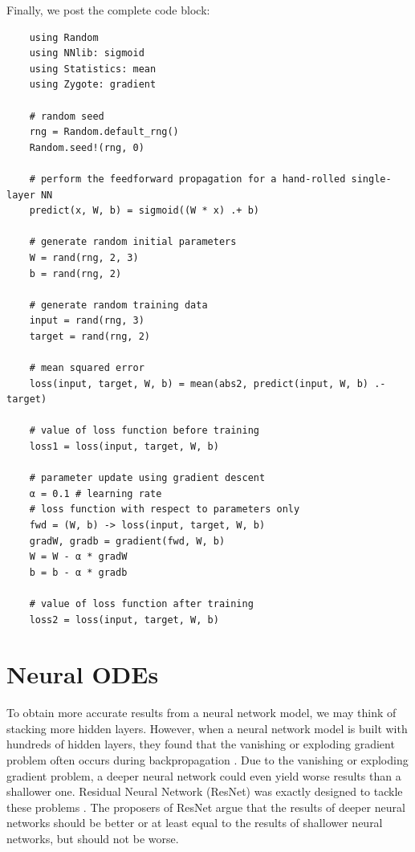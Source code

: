 \documentclass[
	parskip, 			   %
	twoside, 			   %
	DIV=14, 			   %
	BCOR=15.0mm, 		   %
	headsepline, 		   %
	open=right, 		   %
	captions=tableheading, %
	bibliography=totoc,    %
	numbers=noenddot       %
]{scrreprt}
\begin{document}
Finally, we post the complete code block:

\begin{verbatim}
    using Random
    using NNlib: sigmoid
    using Statistics: mean
    using Zygote: gradient
    
    # random seed
    rng = Random.default_rng()
    Random.seed!(rng, 0)
    
    # perform the feedforward propagation for a hand-rolled single-layer NN
    predict(x, W, b) = sigmoid((W * x) .+ b)
    
    # generate random initial parameters
    W = rand(rng, 2, 3)
    b = rand(rng, 2)
    
    # generate random training data
    input = rand(rng, 3)
    target = rand(rng, 2)
    
    # mean squared error
    loss(input, target, W, b) = mean(abs2, predict(input, W, b) .- target)
    
    # value of loss function before training
    loss1 = loss(input, target, W, b)
    
    # parameter update using gradient descent
    α = 0.1 # learning rate
    # loss function with respect to parameters only
    fwd = (W, b) -> loss(input, target, W, b)
    gradW, gradb = gradient(fwd, W, b)
    W = W - α * gradW
    b = b - α * gradb

    # value of loss function after training
    loss2 = loss(input, target, W, b)
\end{verbatim}


\clearpage
\chapter{Neural ODEs}
\label{ch:chapter5}
To obtain more accurate results from a neural network model, we may think of stacking more hidden layers. However, when a neural network model is built with hundreds of hidden layers, they found that the vanishing or exploding gradient problem often occurs during backpropagation \cite{glorot2010understanding}. Due to the vanishing or exploding gradient problem, a deeper neural network could even yield worse results than a shallower one. Residual Neural Network (ResNet) was exactly designed to tackle these problems \cite{he2016deep}. The proposers of ResNet argue that the results of deeper neural networks should be better or at least equal to the results of shallower neural networks, but should not be worse.
\end{document}
